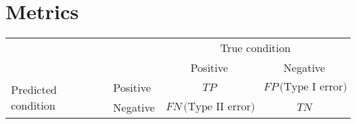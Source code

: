 \documentclass{article}
\begin{document}
\section{Metrics}

\begin{tabular}{l|l|c|c|}
\multicolumn{2}{c}{}&\multicolumn{2}{c}{True condition}\\
\cline{3-4}
\multicolumn{2}{c|}{}&Positive&Negative\\
\cline{2-4}
\multirow{2}{*}{Predicted condition}& Positive & $TP$ & $FP \, \mbox{(Type I error)}$\\
\cline{2-4}
& Negative & $FN \, \mbox{(Type II error)}$ & $TN$\\
\cline{2-4}
\end{tabular}
\end{document}
